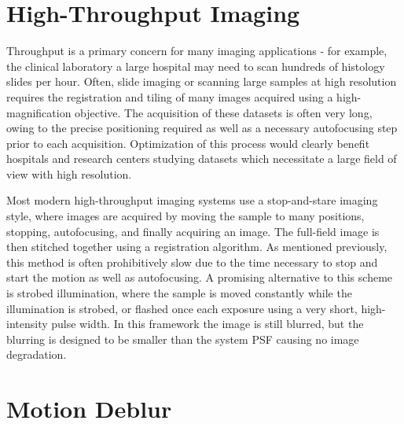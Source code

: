 
\section{High-Throughput Imaging}
Throughput is a primary concern for many imaging applications - for example, the clinical laboratory a large hospital may need to scan hundreds of histology slides per hour. Often, slide imaging or scanning large samples at high resolution requires the registration and tiling of many images acquired using a high-magnification objective. The acquisition of these datasets is often very long, owing to the precise positioning required as well as a necessary autofocusing step prior to each acquisition. Optimization of this process would clearly benefit hospitals and research centers studying datasets which necessitate a large field of view with high resolution.

Most modern high-throughput imaging systems use a stop-and-stare imaging style, where images are acquired by moving the sample to many positions, stopping, autofocusing, and finally acquiring an image. The full-field image is then stitched together using a registration algorithm. As mentioned previously, this method is often prohibitively slow due to the time necessary to stop and start the motion as well as autofocusing. A promising alternative to this scheme is strobed illumination, where the sample is moved constantly while the illumination is strobed, or flashed once each exposure using a very short, high-intensity pulse width. In this framework the image is still blurred, but the blurring is designed to be smaller than the system PSF causing no image degradation.

\section{Motion Deblur}

